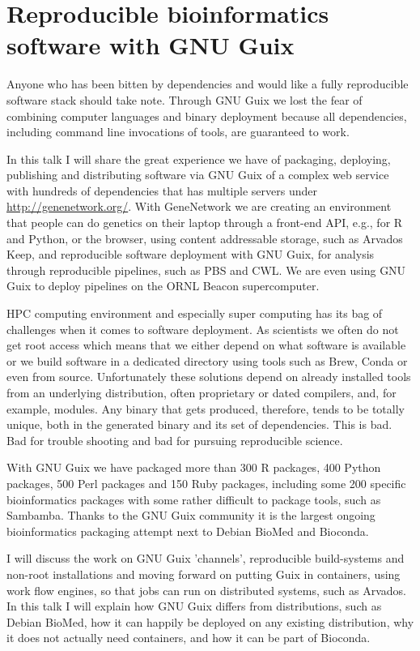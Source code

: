 



\newcommand{\makeln}[1]{ \NOK & \moneyfont{#1} & \EUR & \convertit{#1}}




\section*{Reproducible bioinformatics software
with GNU Guix}

Anyone who has been bitten by dependencies and would like a fully
reproducible software stack should take note. Through GNU Guix we lost
the fear of combining computer languages and binary deployment because
all dependencies, including command line invocations of tools, are
guaranteed to work.

In this talk I will share the great experience we have of packaging,
deploying, publishing and distributing software via GNU Guix of a
complex web service with hundreds of dependencies that has multiple
servers under \hbox{\url{http://genenetwork.org/}}. With GeneNetwork
we are creating an environment that people can do genetics on their
laptop through a front-end API, e.g., for R and Python, or the
browser, using content addressable storage, such as Arvados Keep, and
reproducible software deployment with GNU Guix, for analysis through
reproducible pipelines, such as PBS and CWL. We are even using GNU
Guix to deploy pipelines on the ORNL Beacon supercomputer.

HPC computing environment and especially super computing has its bag
of challenges when it comes to software deployment. As scientists we
often do not get root access which means that we either depend on what
software is available or we build software in a dedicated directory
using tools such as Brew, Conda or even from source. Unfortunately
these solutions depend on already installed tools from an underlying
distribution, often proprietary or dated compilers, and, for example,
modules. Any binary that gets produced, therefore, tends to be totally
unique, both in the generated binary and its set of dependencies. This
is bad. Bad for trouble shooting and bad for pursuing reproducible
science.

With GNU Guix we have packaged more than 300 R packages, 400 Python
packages, 500 Perl packages and 150 Ruby packages, including some 200
specific bioinformatics packages with some rather difficult to package
tools, such as Sambamba. Thanks to the GNU Guix community it is the
largest ongoing bioinformatics packaging attempt next to Debian BioMed
and Bioconda.

I will discuss the work on GNU Guix 'channels', reproducible
build-systems and non-root installations and moving forward on putting
Guix in containers, using work flow engines, so that jobs can run on
distributed systems, such as Arvados. In this talk I will explain how
GNU Guix differs from distributions, such as Debian BioMed, how it can
happily be deployed on any existing distribution, why it does not
actually need containers, and how it can be part of Bioconda.


